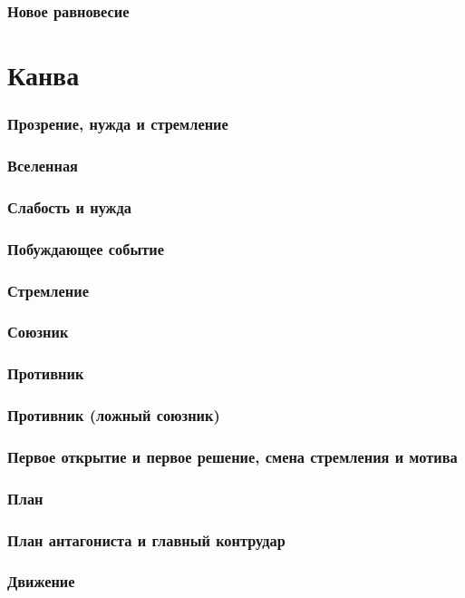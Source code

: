 \section{Новое равновесие}



\clearpage
\part{Канва}
\section{Прозрение, нужда и стремление}
\section{Вселенная}
\section{Слабость и нужда}
\section{Побуждающее событие}
\section{Стремление}
\section{Союзник}
\section{Противник}
\section{Противник (ложный союзник)}
\section{Первое открытие и первое решение, смена стремления и мотива}
\section{План}
\section{План антагониста и главный контрудар}
\section{Движение}
